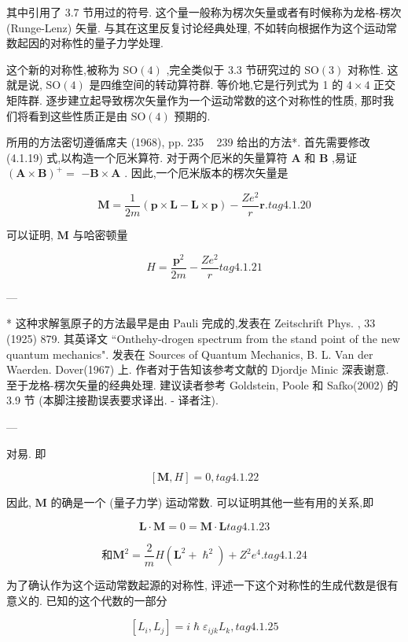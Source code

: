 其中引用了 3.7 节用过的符号. 这个量一般称为楞次矢量或者有时候称为龙格-楞次 (Runge-Lenz) 矢量. 与其在这里反复讨论经典处理, 不如转向根据作为这个运动常数起因的对称性的量子力学处理.

这个新的对称性,被称为 $\mathrm{{SO}}\left( 4\right)$ ,完全类似于 3.3 节研究过的 $\mathrm{{SO}}\left( 3\right)$ 对称性. 这就是说, $\mathrm{{SO}}\left( 4\right)$ 是四维空间的转动算符群. 等价地,它是行列式为 1 的 $4 \times 4$ 正交矩阵群. 逐步建立起导致楞次矢量作为一个运动常数的这个对称性的性质, 那时我们将看到这些性质正是由 $\mathrm{{SO}}\left( 4\right)$ 预期的.

所用的方法密切遵循席夫 (1968), pp. 235 ~ 239 给出的方法*. 首先需要修改 (4.1.19) 式,以构造一个厄米算符. 对于两个厄米的矢量算符 $\mathbf{A}$ 和 $\mathbf{B}$ ,易证 ${\left( \mathbf{A} \times \mathbf{B}\right) }^{ + } =$ $- \mathbf{B} \times \mathbf{A}$ . 因此,一个厄米版本的楞次矢量是

$$
\mathbf{M} = \frac{1}{2m}\left( {\mathbf{p} \times \mathbf{L} - \mathbf{L} \times \mathbf{p}}\right) - \frac{Z{e}^{2}}{r}\mathbf{r}. tag{4. 1.20}
$$

可以证明, $\mathbf{M}$ 与哈密顿量

$$
H = \frac{{\mathbf{p}}^{2}}{2m} - \frac{Z{e}^{2}}{r} tag{4. 1.21}
$$

---

* 这种求解氢原子的方法最早是由 Pauli 完成的,发表在 Zeitschrift Phys. , 33 (1925) 879. 其英译文 “Onthehy-drogen spectrum from the stand point of the new quantum mechanics". 发表在 Sources of Quantum Mechanics, B. L. Van der Waerden. Dover(1967) 上. 作者对于告知该参考文献的 Djordje Minic 深表谢意. 至于龙格-楞次矢量的经典处理. 建议读者参考 Goldstein, Poole 和 Safko(2002) 的 3.9 节 (本脚注接勘误表要求译出. - 译者注).

---

对易. 即

$$
\left\lbrack {\mathbf{M}, H}\right\rbrack = 0, tag{4. 1.22}
$$

因此, $\mathbf{M}$ 的确是一个 (量子力学) 运动常数. 可以证明其他一些有用的关系,即

$$
\mathbf{L} \cdot \mathbf{M} = 0 = \mathbf{M} \cdot \mathbf{L} tag{4. 1.23}
$$

$$
\text{和}{\mathbf{M}}^{2} = \frac{2}{m}H\left( {{\mathbf{L}}^{2} + {\hslash }^{2}}\right) + {Z}^{2}{e}^{4}\text{.} tag{4. 1.24}
$$

为了确认作为这个运动常数起源的对称性, 评述一下这个对称性的生成代数是很有意义的. 已知的这个代数的一部分

$$
\left\lbrack {{L}_{i},{L}_{j}}\right\rbrack = i\hslash {\varepsilon }_{ijk}{L}_{k}, tag{4. 1.25}
$$

